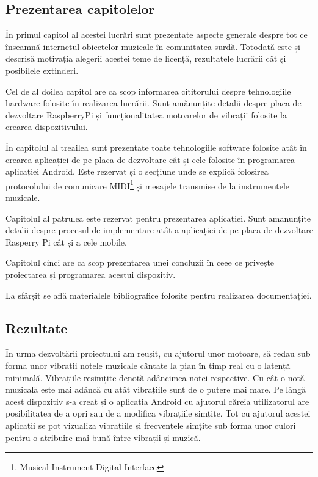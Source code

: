 \documentclass[../IoMusT.tex]{subfiles}
\begin{document}
\subsection{Prezentarea capitolelor}
În primul capitol al acestei lucrări sunt prezentate aspecte generale des\-pre tot ce înseamnă internetul obiectelor muzicale în comunitatea surdă. Tot\-o\-da\-tă este și descrisă motivația alegerii acestei teme de licență, rezultatele lucrării cât și posibilele extinderi.
\\
\par Cel de al doilea capitol are ca scop informarea cititorului despre tehnologiile hardware folosite în realizarea lucrării. Sunt amănunțite detalii despre placa de dezvoltare RaspberryPi și funcționalitatea motoarelor de vibrații folosite la crearea dispozitivului.
\\
\par În capitolul al treailea sunt prezentate toate tehnologiile software folosite atât în crearea aplicației de pe placa de dezvoltare cât și cele folosite în programarea aplicației Android. Este rezervat și o secțiune unde se explică folosirea protocolului de comunicare MIDI\footnote{Musical Instrument Digital Interface} și mesajele transmise de la instrumentele muzicale.
\\
\par Capitolul al patrulea este rezervat pentru prezentarea aplicației. Sunt amănunțite detalii despre procesul de implementare atât a aplicației de pe placa de dezvoltare Rasperry Pi cât și a cele mobile.
\\
\par Capitolul cinci are ca scop prezentarea unei concluzii în ceee ce privește proiectarea și programarea acestui dispozitiv.
\\
\par La sfârșit se află materialele bibliografice folosite pentru realizarea do\-cu\-men\-ta\-ți\-ei.
\subsection{Rezultate}
În urma dezvoltării proiectului am reușit, cu ajutorul unor motoare, să redau sub forma unor vibrații notele muzicale cântate la pian în timp real cu o latență minimală. Vibrațiile resimțite denotă adâncimea notei respective. Cu cât o notă muzicală este mai adâncă cu atât vibrațiile sunt de o putere mai mare. Pe lângă acest dispozitiv s-a creat și o aplicația Android cu ajutorul căreia utilizatorul are posibilitatea de a opri sau de a modifica vibrațiile simțite. Tot cu ajutorul acestei aplicații se pot vizualiza vibrațiile și frecvențele simțite sub forma unor culori pentru o atribuire mai bună între vibrații și muzică. 
\end{document}
